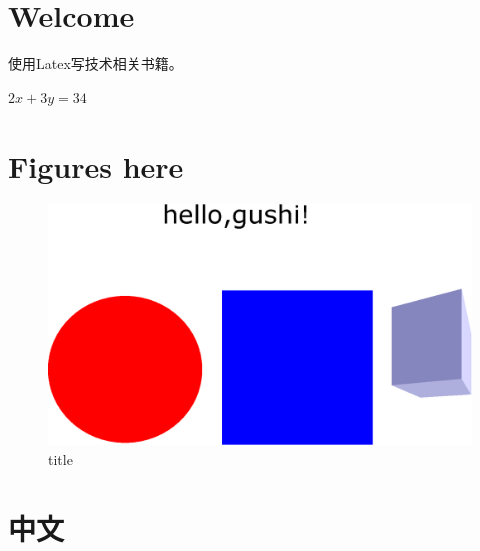 \documentclass[a4paper,12pt]{article}
\begin{document}


\section{Welcome}

使用Latex写技术相关书籍。

$2x+3y=34$






\section{Figures here}
\begin{figure}
\centering
\includegraphics[width=\textwidth]{hello.eps}
\caption{title}
\end{figure}

\section{中文}
\end{document}
